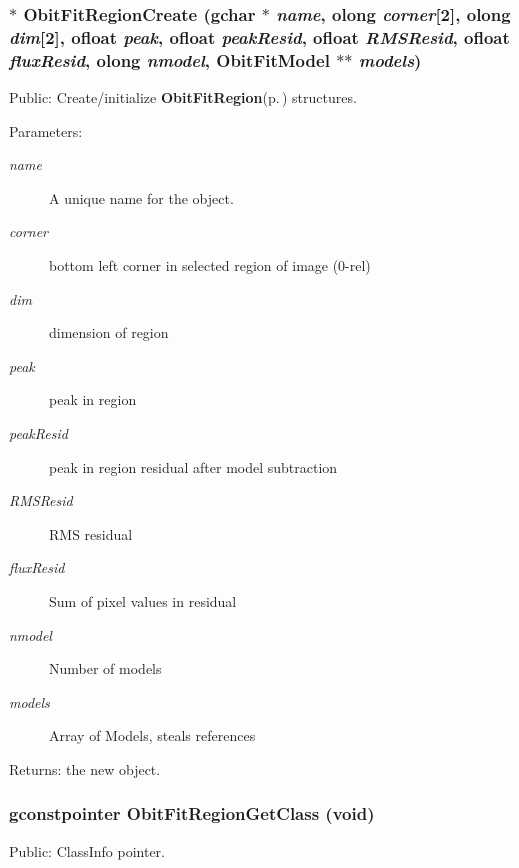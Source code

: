 \subsubsection{$\ast$ Obit\-Fit\-Region\-Create (gchar $\ast$ {\em name}, {\bf olong} {\em corner}[2], {\bf olong} {\em dim}[2], {\bf ofloat} {\em peak}, {\bf ofloat} {\em peak\-Resid}, {\bf ofloat} {\em RMSResid}, {\bf ofloat} {\em flux\-Resid}, {\bf olong} {\em nmodel}, {\bf Obit\-Fit\-Model} $\ast$$\ast$ {\em models})}\label{ObitFitRegion_8h_a6}


Public: Create/initialize {\bf Obit\-Fit\-Region}{\rm (p.\,\pageref{structObitFitRegion})} structures. 

\begin{Desc}
\item[Parameters:]
\begin{description}
\item[{\em name}]A unique name for the object. \item[{\em corner}]bottom left corner in selected region of image (0-rel) \item[{\em dim}]dimension of region \item[{\em peak}]peak in region \item[{\em peak\-Resid}]peak in region residual after model subtraction \item[{\em RMSResid}]RMS residual \item[{\em flux\-Resid}]Sum of pixel values in residual \item[{\em nmodel}]Number of models \item[{\em models}]Array of Models, steals references \end{description}
\end{Desc}
\begin{Desc}
\item[Returns:]the new object. \end{Desc}
\subsubsection{\setlength{\rightskip}{0pt plus 5cm}gconstpointer Obit\-Fit\-Region\-Get\-Class (void)}\label{ObitFitRegion_8h_a8}


Public: Class\-Info pointer. 


